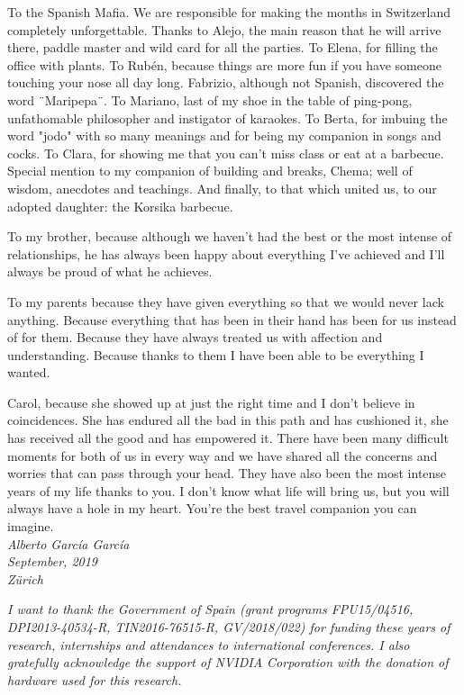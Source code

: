 To the Spanish Mafia. We are responsible for making the months in Switzerland completely unforgettable. Thanks to Alejo, the main reason that he will arrive there, paddle master and wild card for all the parties. To Elena, for filling the office with plants. To Rubén, because things are more fun if you have someone touching your nose all day long. Fabrizio, although not Spanish, discovered the word ¨Maripepa¨. To Mariano, last of my shoe in the table of ping-pong, unfathomable philosopher and instigator of karaokes. To Berta, for imbuing the word "jodo" with so many meanings and for being my companion in songs and cocks. To Clara, for showing me that you can't miss class or eat at a barbecue. Special mention to my companion of building and breaks, Chema; well of wisdom, anecdotes and teachings. And finally, to that which united us, to our adopted daughter: the Korsika barbecue.

To my brother, because although we haven't had the best or the most intense of relationships, he has always been happy about everything I've achieved and I'll always be proud of what he achieves.

To my parents because they have given everything so that we would never lack anything. Because everything that has been in their hand has been for us instead of for them. Because they have always treated us with affection and understanding. Because thanks to them I have been able to be everything I wanted.

Carol, because she showed up at just the right time and I don't believe in coincidences. She has endured all the bad in this path and has cushioned it, she has received all the good and has empowered it. There have been many difficult moments for both of us in every way and we have shared all the concerns and worries that can pass through your head. They have also been the most intense years of my life thanks to you. I don't know what life will bring us, but you will always have a hole in my heart. You're the best travel companion you can imagine.\\

\noindent\emph{Alberto García García}\\
\emph{September, 2019}\\
\emph{Zürich}\\

\vfill

\emph{I want to thank the Government of Spain (grant programs FPU15/04516, DPI2013-40534-R, TIN2016-76515-R, GV/2018/022) for funding these years of research, internships and attendances to international conferences. I also gratefully acknowledge the support of NVIDIA Corporation with the donation of hardware used for this research.}\\

